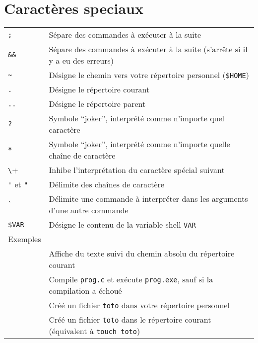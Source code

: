 \documentclass [a4paper]{article}
\begin{document}
\section*{Caractères speciaux}

\noindent
\begin{tabular}{ ll }
\hline
{\verb+;+}             & Sépare des commandes à exécuter à la suite \\
{\verb+&&+}            & Sépare des commandes à exécuter à la suite (s'arrête si il y a eu des erreurs)\\
{\verb+~+}             & Désigne le chemin vers votre répertoire personnel (\verb+$HOME+) \\
{\verb+.+}             & Désigne le répertoire courant \\
{\verb+..+}            & Désigne le répertoire parent \\
{\verb+?+}             & Symbole ``joker'', interprété comme \og{} n'importe quel caractère \fg{} \\
{\verb+*+}             & Symbole ``joker'', interprété comme \og{} n'importe quelle chaîne de caractère \fg{} \\
{\verb+\+}             & Inhibe l'interprétation du caractère spécial suivant \\
{\verb+'+ et \verb+"+} & Délimite des chaînes de caractère \\
{\verb+`+}             & Délimite une commande à interpréter dans les arguments d'une autre commande \\
{\verb+$VAR+}          & Désigne le contenu de la variable shell \verb+VAR+ \\
\hline
Exemples                                            &   \\
\hspace{0.5cm}{\verb+echo "Je suis dans"; pwd+}     & Affiche du texte suivi du chemin absolu du répertoire courant \\
\hspace{0.5cm}{\verb+compile prog.c && ./prog.exe+} & Compile \verb+prog.c+ et exécute \verb+prog.exe+, sauf si la compilation a échoué \\
\hspace{0.5cm}{\verb+touch ~/toto+}                 & Créé un fichier \verb+toto+ dans votre répertoire personnel \\
\hspace{0.5cm}{\verb+touch ./toto+}                 & Créé un fichier \verb+toto+ dans le répertoire courant (équivalent à \verb+touch toto+)\\

\end{tabular}
\end{document}
